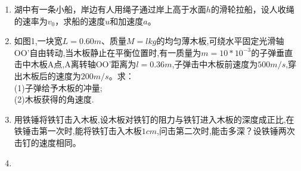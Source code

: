 
\begin{enumerate}
\item 湖中有一条小船，岸边有人用绳子通过岸上高于水面$h$的滑轮拉船，设人收绳的速率为$v_0$，求船的速度$u$和加速度$a$。
\item 如图1,一块宽$L=0.60m$、质量$M=lkg$的均匀薄木板,可绕水平固定光滑轴OO'自由转动,当木板静止在平衡位置时,有一质量为$m=10*10^{-3}$的子弹垂直击中木板A点,A离转轴OO'距离为$l=0.36m$,子弹击中木板前速度为$500m/s$,穿出木板后的速度为$200m/s$。求：\\
(1)子弹给予木板的冲量;\\
(2)木板获得的角速度.
\item 用铁锤将铁钉击入木板,设木板对铁钉的阻力与铁钉进入木板的深度成正比,在铁锤击第一次时,能将铁钉击入木板$1cm$,问击第二次时,能击多深？设铁锤两次击钉的速度相同。
\item 
\end{enumerate}